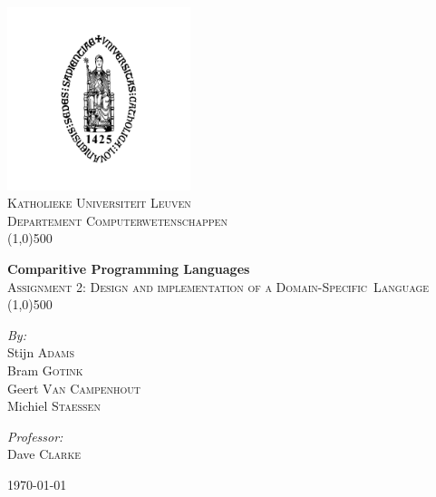 \documentclass[a4paper,11pt]{article}
\begin{document}
\begin{titlepage}

\begin{center}


\includegraphics[width=0.40\textwidth]{logo.png}\\[1cm]    

\textsc{\LARGE Katholieke Universiteit Leuven}\\[0.3cm]

\textsc{\Large Departement Computerwetenschappen}\\[2.0cm]

\line(1,0){500}
\vspace{5 mm}

{ \huge \bfseries Comparitive Programming Languages}\\[0.2cm]
\textsc{ \Large Assignment 2: Design and implementation of a \mbox{Domain-Specific Language} }\\[0.4cm]

\line(1,0){500}
\vspace{20 mm}

\begin{minipage}{0.4\textwidth}
\begin{flushleft} \large
\emph{By:}\\
Stijn \textsc{Adams} \\
Bram \textsc{Gotink} \\
Geert \textsc{Van Campenhout} \\
Michiel \textsc{Staessen}

\end{flushleft}
\end{minipage}
\begin{minipage}{0.4\textwidth}
\begin{flushright} \large
\emph{Professor:} \\
Dave \textsc{Clarke}\\
\vspace{15 mm}
\end{flushright}
\end{minipage}

\vfill

{\large \today}

\end{center}

\end{titlepage}
\end{document}
